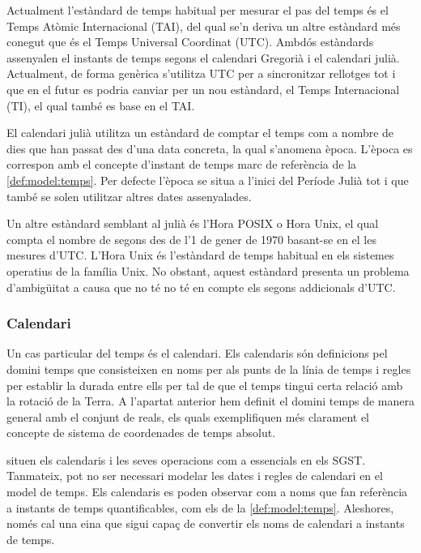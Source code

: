 Actualment l'estàndard de temps habitual per mesurar el pas del temps
és el Temps Atòmic Internacional (TAI), del qual se'n deriva un altre
estàndard més conegut que és el Temps Universal Coordinat (UTC).
Ambdós estàndards assenyalen el instants de temps segons el calendari
Gregorià i el calendari julià. Actualment, de forma genèrica s'utilitza
UTC per a sincronitzar rellotges tot i que en el futur es podria
canviar per un nou estàndard, el Temps Internacional (TI), el qual
també es base en el TAI.

El calendari julià utilitza un estàndard de comptar el temps com a
nombre de dies que han passat des d'una data concreta, la qual
s'anomena època. L'època es correspon amb el concepte d'instant de
temps marc de referència de la \autoref{def:model:temps}. Per defecte
l'època se situa a l'inici del Període Julià tot i que també se solen
utilitzar altres dates assenyalades.

Un altre estàndard semblant al julià és l'Hora POSIX o Hora Unix, el
qual compta el nombre de segons des de l'1 de gener de 1970 basant-se
en el les mesures d'UTC. L'Hora Unix és l'estàndard de temps habitual
en els sistemes operatius de la família Unix. No obstant, aquest
estàndard presenta un problema d'ambigüitat a causa que no té no té en
compte els segons addicionals d'UTC.





\subsubsection{Calendari}

Un cas particular del temps és el calendari. Els calendaris són
definicions pel domini temps que consisteixen en noms per als punts de
la línia de temps i regles per establir la durada entre ells per tal
de que el temps tingui certa relació amb la rotació de la Terra. A
l'apartat anterior hem definit el domini temps de manera general
amb el conjunt de reals, els quals exemplifiquen més clarament el
concepte de sistema de coordenades de temps absolut.

\textcite{dreyer94} situen els calendaris i les seves operacions com a
essencials en els SGST. Tanmateix, pot no ser necessari modelar les
dates i regles de calendari en el model de temps. Els calendaris es
poden observar com a noms que fan referència a instants de temps
quantificables, com els de la \autoref{def:model:temps}. Aleshores,
només cal una eina que sigui capaç de convertir els noms de calendari
a instants de temps.

